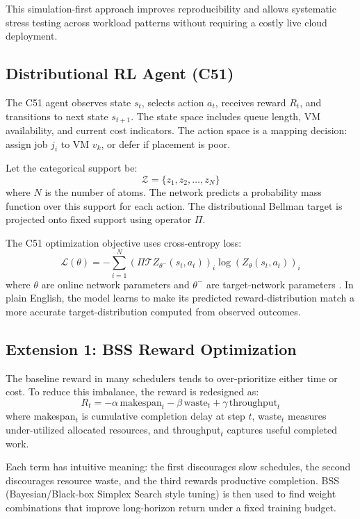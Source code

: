 This simulation-first approach improves reproducibility and allows systematic stress testing across workload patterns without requiring a costly live cloud deployment.

\subsection{Distributional RL Agent (C51)}
The C51 agent observes state $s_t$, selects action $a_t$, receives reward $R_t$, and transitions to next state $s_{t+1}$. The state space includes queue length, VM availability, and current cost indicators. The action space is a mapping decision: assign job $j_i$ to VM $v_k$, or defer if placement is poor.

Let the categorical support be:
\[
\mathcal{Z} = \{z_1, z_2, \ldots, z_N\}
\]
where $N$ is the number of atoms. The network predicts a probability mass function over this support for each action. The distributional Bellman target is projected onto fixed support using operator $\Pi$.

The C51 optimization objective uses cross-entropy loss:
\[
\mathcal{L}(\theta) = -\sum_{i=1}^{N}\left(\Pi\mathcal{T}Z_{\theta^-}(s_t,a_t)\right)_i \log\left(Z_{\theta}(s_t,a_t)\right)_i
\]
where $\theta$ are online network parameters and $\theta^-$ are target-network parameters \cite{bellemare2017distributional}. In plain English, the model learns to make its predicted reward-distribution match a more accurate target-distribution computed from observed outcomes.

\subsection{Extension 1: BSS Reward Optimization}
The baseline reward in many schedulers tends to over-prioritize either time or cost. To reduce this imbalance, the reward is redesigned as:
\[
R_t = -\alpha\,\text{makespan}_t - \beta\,\text{waste}_t + \gamma\,\text{throughput}_t
\]
where makespan$_t$ is cumulative completion delay at step $t$, waste$_t$ measures under-utilized allocated resources, and throughput$_t$ captures useful completed work.

Each term has intuitive meaning: the first discourages slow schedules, the second discourages resource waste, and the third rewards productive completion. BSS (Bayesian/Black-box Simplex Search style tuning) is then used to find weight combinations that improve long-horizon return under a fixed training budget.

